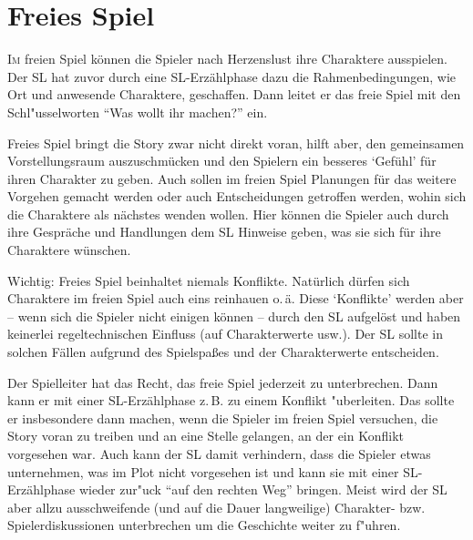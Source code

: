 \chapter{Freies Spiel}\label{Ch:FreiesSpiel}
\lettrine{I}{m} freien Spiel können die Spieler nach Herzenslust ihre Charaktere ausspielen. Der SL hat zuvor durch eine SL-Erzählphase dazu die Rahmenbedingungen, wie Ort und anwesende Charaktere, geschaffen. Dann leitet er das freie Spiel mit den Schl"usselworten ``Was wollt ihr machen?'' ein.

Freies Spiel bringt die Story zwar nicht direkt voran, hilft aber, den gemeinsamen Vorstellungsraum auszuschmücken und den Spielern ein besseres `Gefühl' für ihren Charakter zu geben. Auch sollen im freien Spiel Planungen für das weitere Vorgehen gemacht werden oder auch Entscheidungen getroffen werden, wohin sich die Charaktere als nächstes wenden wollen. Hier können die Spieler auch durch ihre Gespräche und Handlungen dem SL Hinweise geben, was sie sich für ihre Charaktere wünschen.

Wichtig: Freies Spiel beinhaltet niemals Konflikte. Natürlich dürfen sich Charaktere im freien Spiel auch eins reinhauen o.\,ä. Diese `Konflikte' werden aber -- wenn sich die Spieler nicht einigen können -- durch den SL aufgelöst und haben keinerlei regeltechnischen Einfluss (auf Charakterwerte usw.). Der SL sollte in solchen Fällen aufgrund des Spielspaßes und der Charakterwerte entscheiden.

Der Spielleiter hat das Recht, das freie Spiel jederzeit zu unterbrechen. Dann kann er mit einer SL-Erzählphase z.\,B. zu einem Konflikt "uberleiten. Das sollte er insbesondere dann machen, wenn die Spieler im freien Spiel versuchen, die Story voran zu treiben und an eine Stelle gelangen, an der ein Konflikt vorgesehen war. Auch kann der SL damit verhindern, dass die Spieler etwas unternehmen, was im Plot nicht vorgesehen ist und kann sie mit einer SL-Erzählphase wieder zur"uck ``auf den rechten Weg'' bringen. Meist wird der SL aber allzu ausschweifende (und auf die Dauer langweilige) Charakter- bzw. Spielerdiskussionen unterbrechen um die Geschichte weiter zu f"uhren.


